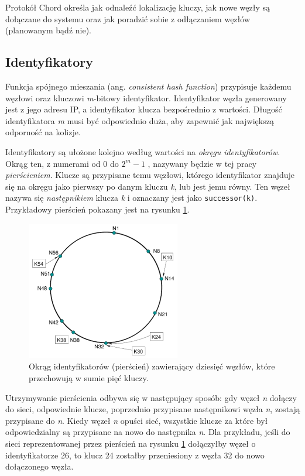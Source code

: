 \documentclass[12pt, twoside, openany]{report}
\begin{document}
Protokół Chord określa jak odnaleźć lokalizację kluczy, jak nowe węzły są dołączane do systemu oraz jak poradzić sobie z odłączaniem węzłów (planowanym bądź nie).

\subsection{Identyfikatory}
\label{ch_ch_id}

Funkcja spójnego mieszania (ang. \textit{consistent hash function}) przypisuje każdemu węzłowi oraz kluczowi \textit{m}-bitowy identyfikator. Identyfikator węzła generowany jest z jego adresu IP, a identyfikator klucza bezpośrednio z wartości. Długość identyfikatora \textit{m} musi być odpowiednio duża, aby zapewnić jak największą odporność na kolizje.

Identyfikatory są ułożone kolejno według wartości na \textit{okręgu identyfikatorów}. Okrąg ten, z numerami od $0$ do  $2^m-1$ , nazywany będzie w tej pracy \textit{pierścieniem}. Klucze są przypisane temu węzłowi, którego identyfikator znajduje się na okręgu jako pierwszy po danym kluczu \textit{k}, lub jest jemu równy. Ten węzeł nazywa się \textit{następnikiem} klucza \textit{k} i oznaczany jest jako \texttt{successor(k)}. Przykładowy pierścień pokazany jest na rysunku \ref{fig:pierscien}.

\begin{figure}[H]
\centering
\includegraphics[width=0.6\textwidth,height=\textheight,keepaspectratio]{ring.png}
\caption{Okrąg identyfikatorów (pierścień) zawierający dziesięć węzłów, które przechowują w sumie pięć kluczy.}
\label{fig:pierscien}
\end{figure}

Utrzymywanie pierścienia odbywa się w następujący sposób: gdy węzeł \textit{n} dołączy do sieci, odpowiednie klucze, poprzednio przypisane następnikowi węzła \textit{n}, zostają przypisane do \textit{n}. Kiedy węzeł \textit{n} opuści sieć, wszystkie klucze za które był odpowiedzialny są przypisane na nowo do następnika \textit{n}. Dla przykładu, jeśli do sieci reprezentowanej przez pierścień na rysunku \ref{fig:pierscien} dołączyłby węzeł o identyfikatorze 26, to klucz 24 zostałby przeniesiony z węzła 32 do nowo dołączonego węzła.
\end{document}
